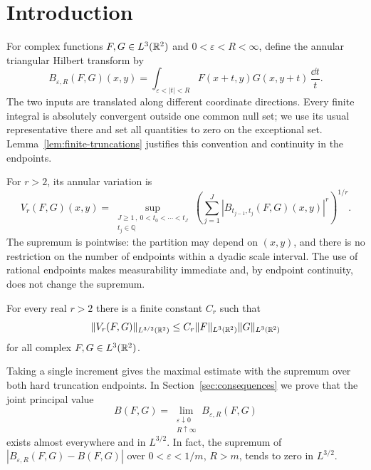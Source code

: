 \section{Introduction}\label{sec:introduction}

For complex functions $F,G\in L^3(\mathbb R^2)$ and
$0<\varepsilon<R<\infty$, define the annular triangular Hilbert transform by
\begin{equation}\label{eq:bilinear-truncation}
 B_{\varepsilon,R}(F,G)(x,y)
 =\int_{\varepsilon<|t|<R}F(x+t,y)G(x,y+t)\,\frac{\dd t}{t}.
\end{equation}
The two inputs are translated along different coordinate directions.
Every finite integral is absolutely convergent outside one common
null set; we use its usual representative there and set all quantities
to zero on the exceptional set. Lemma~\ref{lem:finite-truncations}
justifies this convention and continuity in the endpoints.

For $r>2$, its annular variation is
\begin{equation}\label{eq:variation-definition}
 V_r(F,G)(x,y)
 =\sup_{\substack{J\ge1\,,\ 0<t_0<\cdots<t_J\\t_j\in\mathbb Q}}
    \left(\sum_{j=1}^J
          |B_{t_{j-1},t_j}(F,G)(x,y)|^r\right)^{1/r}.
\end{equation}
The supremum is pointwise: the partition may depend on $(x,y)$, and
there is no restriction on the number of endpoints within a dyadic
scale interval. The use of rational endpoints makes measurability
immediate and, by endpoint continuity, does not change the supremum.

\begin{theorem}\label{thm:variation}
For every real $r>2$ there is a finite constant $C_r$ such that
\[
 \|V_r(F,G)\|_{L^{3/2}(\mathbb R^2)}
 \le C_r\|F\|_{L^3(\mathbb R^2)}\|G\|_{L^3(\mathbb R^2)}
\]
for all complex $F,G\in L^3(\mathbb R^2)$.
\end{theorem}

Taking a single increment gives the maximal estimate with the supremum
over both hard truncation endpoints. In Section~\ref{sec:consequences}
we prove that the joint principal value
\[
 B(F,G)=\lim_{\substack{\varepsilon\downarrow0\\R\uparrow\infty}}
                   B_{\varepsilon,R}(F,G)
\]
exists almost everywhere and in $L^{3/2}$. In fact, the supremum of
$|B_{\varepsilon,R}(F,G)-B(F,G)|$ over
$0<\varepsilon<1/m$, $R>m$, tends to zero in $L^{3/2}$.

